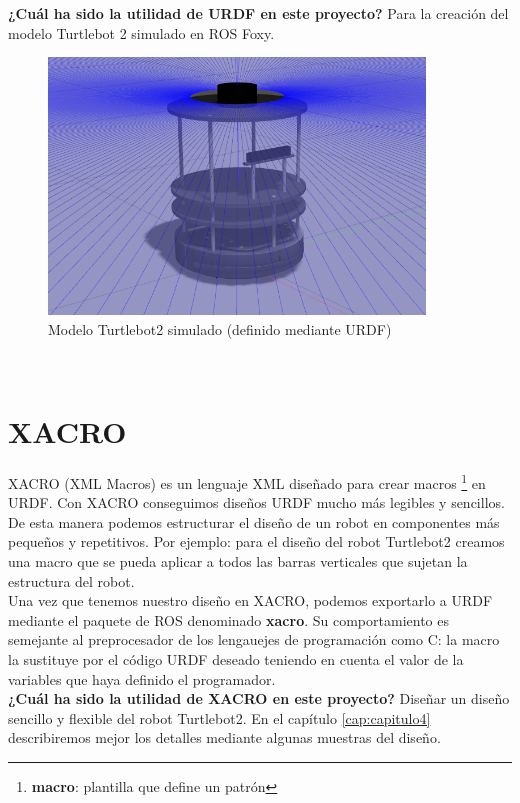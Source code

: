 \textbf{¿Cuál ha sido la utilidad de URDF en este proyecto?} Para la creación del modelo Turtlebot 2 simulado en ROS Foxy.
\begin{figure} [H]
  \begin{center}
    \includegraphics[width=10cm]{imagenes/turtlebot2-sim.png}
  \end{center}
  \caption{Modelo Turtlebot2 simulado (definido mediante URDF)}
  \label{fig:ros_master_comunicación}
\end{figure}\




\section{XACRO}
\label{sec:xacro}

XACRO (XML Macros) es un lenguaje XML diseñado para crear macros \footnote{\textbf{macro}: plantilla que define un patrón} en URDF. Con XACRO conseguimos diseños URDF mucho más legibles y sencillos. De esta manera podemos estructurar el diseño de un robot en componentes más pequeños y repetitivos. Por ejemplo: para el diseño del robot Turtlebot2 creamos una macro que se pueda aplicar a todos las barras verticales que sujetan la estructura del robot.\\

Una vez que tenemos nuestro diseño en XACRO, podemos exportarlo a URDF mediante el paquete de ROS denominado \textbf{xacro}. Su comportamiento es semejante al preprocesador de los lengauejes de programación como C: la macro la sustituye por el código URDF deseado teniendo en cuenta el valor de la variables que haya definido el programador.\\

\textbf{¿Cuál ha sido la utilidad de XACRO en este proyecto?} Diseñar un diseño sencillo y flexible del robot Turtlebot2. En el capítulo \ref{cap:capitulo4} describiremos mejor los detalles mediante algunas muestras del diseño.\\



